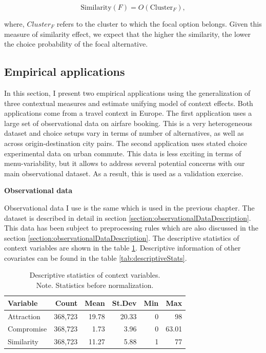 \documentclass[a4paper,12pt]{article}
\begin{document}
 $$\text{Similarity}(F) = O(\text{Cluster}_F) ,
$$

where, $Cluster_F$ refers to the cluster to which the focal option belongs. Given this measure of similarity effect, we expect that the higher the similarity, the lower the choice probability of the focal alternative.

\subsection{Empirical applications}

In this section, I present two empirical applications using the generalization of three contextual measures and estimate unifying model of context effects. Both applications come from a travel context in Europe. The first application uses a large set of observational data on airfare booking. This is a very heterogeneous dataset and choice setups vary in terms of number of alternatives, as well as across origin-destination city pairs. The second application uses stated choice experimental data on urban commute. This data is less exciting in terms of menu-variability, but it allows to address several potential concerns with our main observational dataset. As a result, this is used as a validation exercise. 

\textbf{Observational data}\label{section:additionalPreprocessingObservationalData}

Observational data I use is the same which is used in the previous chapter. The dataset is described in detail in section \ref{section:observationalDataDescription}. This data has been subject to preprocessing rules which are also discussed in the section \ref{section:observationalDataDescription}. The descriptive statistics of context variables are shown in the table \ref{tab:descriptivesContextOnly}. Descriptive information of other covariates can be found in the table \ref{tab:descriptiveStats}.

\begin{table}[ht]
\centering
\begin{tabular}{lrrrrr}
\hline
Variable & Count & Mean & St.Dev & Min & Max \\
\hline
Attraction & 368,723 & 19.78 & 20.33 & 0 & 98 \\
Compromise & 368,723 & 1.73 & 3.96 & 0 & 63.01 \\
Similarity & 368,723 & 11.27 & 5.88 & 1 & 77 \\
\hline
\end{tabular}
\caption{Descriptive statistics of context variables. \\ Note. Statistics before normalization.}
\label{tab:descriptivesContextOnly}
\end{table}
\end{document}
